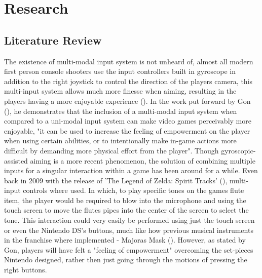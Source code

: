 \documentclass[11pt, a4paper]{article}
\newcommand{\citethis}[1]{(\cite{#1})}
\begin{document}
\pagebreak
\section{Research}	
\subsection{Literature Review}	%
The existence of multi-modal input system is not unheard of, almost all modern first person console shooters use the input controllers built in gyroscope in addition to the right joystick to control the direction of the players camera, this multi-input system allows much more finesse when aiming, resulting in the players having a more enjoyable experience \citethis{toktacs2019evaluation}. In the work put forward by Gon \citethis{da2014multimodal}, he demonstrates that the inclusion of a multi-modal input system when compared to a uni-modal input system can make video games perceivably more enjoyable, "it can be used to increase the feeling of empowerment on the player when using certain abilities, or to intentionally make in-game actions more difficult by demanding more physical effort from the player". Though gyroscopic-assisted aiming is a more recent phenomenon, the solution of combining multiple inputs for a singular interaction within a game has been around for a while. Even back in 2009 with the release of 'The Legend of Zelda: Spirit Tracks' \citethis{thelegendofzelda_spirittracks}, multi-input controls where used. In which, to play specific tones on the games flute item, the player would be required to blow into the microphone and using the touch screen to move the flutes pipes into the center of the screen to select the tone. This interaction could very easily be performed using just the touch screen or even the Nintendo DS's buttons, much like how previous musical instruments in the franchise where implemented - Majoras Mask \citethis{thelegendofzelda_majorasmask}. However, as stated by Gon, players will have felt a "feeling of empowerment" overcoming the set-pieces Nintendo designed, rather then just going through the motions of pressing the right buttons.

\hfill
\end{document}
